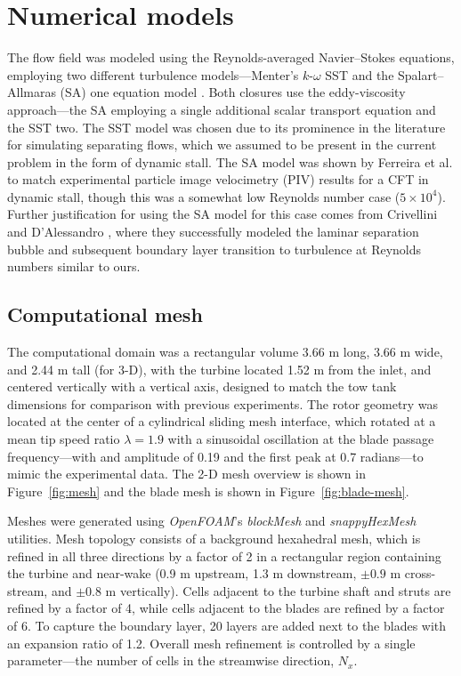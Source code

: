 \section{Numerical models}

The flow field was modeled using the Reynolds-averaged Navier--Stokes equations,
employing two different turbulence models---Menter's $k$-$\omega$ SST
\cite{Menter1994} and the Spalart--Allmaras (SA) one equation model
\cite{Spalart1992}. Both closures use the eddy-viscosity approach---the SA
employing a single additional scalar transport equation and the SST two. The SST
model was chosen due to its prominence in the literature for simulating
separating flows, which we assumed to be present in the current problem in the
form of dynamic stall. The SA model was shown by Ferreira et al.
\cite{Ferreira2007} to match experimental particle image velocimetry (PIV)
results for a CFT in dynamic stall, though this was a somewhat low Reynolds
number case ($5 \times 10^4$). Further justification for using the SA model for
this case comes from Crivellini and D'Alessandro \cite{Crivellini2014}, where
they successfully modeled the laminar separation bubble and subsequent boundary
layer transition to turbulence at Reynolds numbers similar to ours.


\subsection{Computational mesh}

The computational domain was a rectangular volume 3.66 m long, 3.66 m wide, and
2.44 m tall (for 3-D), with the turbine located 1.52 m from the inlet, and
centered vertically with a vertical axis, designed to match the tow tank
dimensions for comparison with previous experiments. The rotor geometry was
located at the center of a cylindrical sliding mesh interface, which rotated at
a mean tip speed ratio $\lambda=1.9$ with a sinusoidal oscillation at the blade
passage frequency---with and amplitude of 0.19 and the first peak at 0.7
radians---to mimic the experimental data. The 2-D mesh overview is shown in
Figure~\ref{fig:mesh} and the blade mesh is shown in
Figure~\ref{fig:blade-mesh}.

Meshes were generated using \textit{OpenFOAM}'s \textit{blockMesh} and
\textit{snappyHexMesh} utilities. Mesh topology consists of a background
hexahedral mesh, which is refined in all three directions by a factor of 2 in a
rectangular region containing the turbine and near-wake (0.9 m upstream, 1.3 m
downstream, $\pm 0.9$ m cross-stream, and $\pm 0.8$ m vertically). Cells
adjacent to the turbine shaft and struts are refined by a factor of 4, while
cells adjacent to the blades are refined by a factor of 6. To capture the
boundary layer, 20 layers are added next to the blades with an expansion ratio
of 1.2. Overall mesh refinement is controlled by a single parameter---the number
of cells in the streamwise direction, $N_x$.

